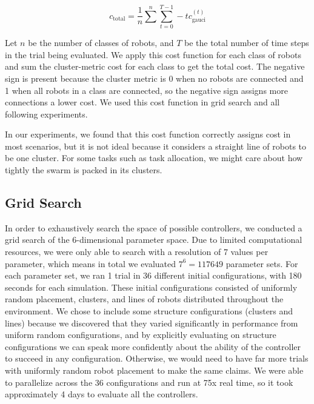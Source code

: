 \documentclass[conference]{IEEEtran}
\begin{document}
    \begin{equation} \label{eq:cluster_cost}
      c_{\text{total}} =  \frac{1}{n}\sum^n\sum_{t=0}^{T-1} -t c_{\text{gauci}}^{(t)}
    \end{equation}

    Let $n$ be the number of classes of robots, and $T$ be the total number of time steps in the trial being evaluated. We apply this cost function for each class of robots and sum the cluster-metric cost for each class to get the total cost. The negative sign is present because the cluster metric is 0 when no robots are connected and 1 when all robots in a class are connected, so the negative sign assigns more connections a lower cost. We used this cost function in grid search and all following experiments.

    In our experiments, we found that this cost function correctly assigns cost in most scenarios, but it is not ideal because it considers a straight line of robots to be one cluster. For some tasks such as task allocation, we might care about how tightly the swarm is packed in its clusters.

  \subsection{Grid Search}

    In order to exhaustively search the space of possible controllers, we conducted a grid search of the 6-dimensional parameter space. Due to limited computational resources, we were only able to search with a resolution of 7 values per parameter, which means in total we evaluated $7^6=117649$ parameter sets. For each parameter set, we ran 1 trial in 36 different initial configurations, with 180 seconds for each simulation. These initial configurations consisted of uniformly random placement, clusters, and lines of robots distributed throughout the environment. We chose to include some structure configurations (clusters and lines) because we discovered that they varied significantly in performance from uniform random configurations, and by explicitly evaluating on structure configurations we can speak more confidently about the ability of the controller to succeed in any configuration. Otherwise, we would need to have far more trials with uniformly random robot placement to make the same claims. We were able to parallelize across the 36 configurations and run at 75x real time, so it took approximately 4 days to evaluate all the controllers.
\end{document}
